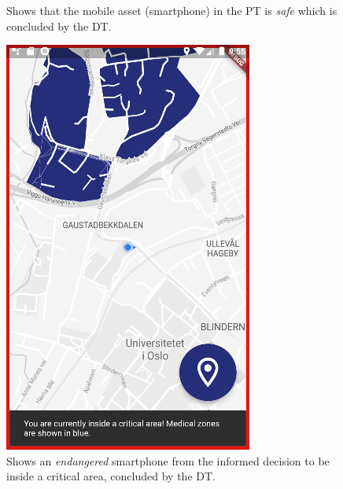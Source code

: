 \documentclass{article}
\begin{document}
\begin{figure}[H]
\begin{minipage}[c]{0.40\linewidth}
        \caption{Shows that the mobile asset (smartphone) in the PT is \emph{safe} which is concluded by the DT.}
        \label{fig:safe_smartphone}
    \end{minipage}
    \hfill
    \begin{minipage}[c]{0.40\linewidth}
        \includegraphics[width=\linewidth]{graphics/endangered_smartphone.png}
        \caption{Shows an \emph{endangered} smartphone from the informed decision to be inside a critical area, concluded by the DT.}
        \label{fig:endangered_smartphone}
    \end{minipage}
\end{figure}
\end{document}
